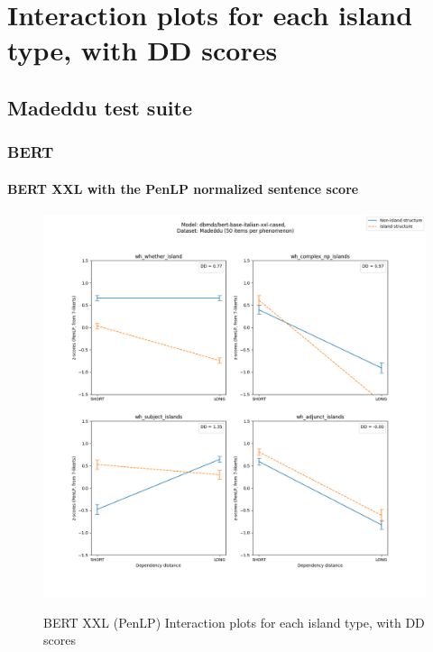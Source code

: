 \chapter{Interaction plots for each island type, with DD scores}

\clearpage
\section{Madeddu test suite}
\subsection{BERT}
\subsubsection{BERT XXL with the PenLP normalized sentence score}
\begin{figure}[h]
	\centering
	\includegraphics[width=1\textwidth]{images/AppendixA/Madeddu_wh_dbmdz_bert-base-italian-xxl-cased_PenLP-zscores-likert-2022-09-14_h15m34s07.png} 
	\label{A-fig:md_bert_penlp}
	\caption{BERT XXL (PenLP) Interaction plots for each island type, with DD scores}
\end{figure}

\clearpage
